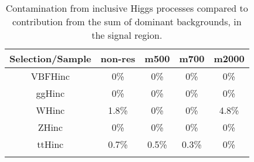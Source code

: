 \begin{table}
\caption{Contamination from inclusive Higgs processes compared to contribution from the sum of dominant backgrounds, in the signal region.} 
\begin{center}
\begin{tabular}{c|c|c|c|c|}
Selection/Sample & non-res & m500 & m700 & m2000 \\
\hline
VBFHinc              & 0\% & 0\%  & 0\% & 0\%\\
\hline
 ggHinc       & 0\% & 0\%   & 0\%  & 0\%\\
 \hline
 WHinc       & 1.8\% & 0\%  & 0\% & 4.8\% \\
  \hline
 ZHinc	       & 0\% & 0\%  & 0\% & 0\%\\
  \hline
  ttHinc		& 0.7\% & 0.5\% & 0.3\% & 0\%\\
\hline
\label{tab:Hinc_contam_sr}
\end{tabular}
\end{center}
\end{table}

